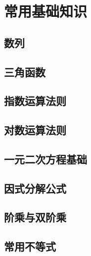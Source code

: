 \documentclass[UTF8, 12pt]{ctexart}
\begin{document}
\section{常用基础知识}
\subsection{数列}
\subsection{三角函数}
\subsection{指数运算法则}
\subsection{对数运算法则}
\subsection{一元二次方程基础}
\subsection{因式分解公式}
\subsection{阶乘与双阶乘}
\subsection{常用不等式}
\end{document}
